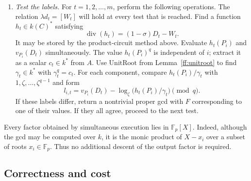 \begin{enumerate}
\item \textit{Test the labels.}
For $t=1,2,\ldots,m$, perform the following operations.
The relation $\lambda d_t=[W_t]$ will hold at every test that is reached.
Find a function $h_t\in k(C)^*$ satisfying
\begin{equation}
                      \operatorname{div}(h_t)
                                   =(1-\sigma)D_t-W_t.
\label{odd:h}
\end{equation}
It may be stored by the product-circuit method above.
Evaluate $h_t(P_i)$ and $v_{P_i}(D_t)$ simultaneously.
The value $h_t(P_i)^q$ is independent of $i$; extract it as a scalar
$c_t\in k^*$ from $A$.
Use $\mathrm{UnitRoot}$ from Lemma~\ref{ff:unitroot} to find
$\gamma_t\in k^*$ with $\gamma_t^q=c_t$.
For each component, compare $h_t(P_i)/\gamma_t$ with
$1,\zeta,\ldots,\zeta^{q-1}$ and form
\begin{equation}
                 l_{i,t}=v_{P_i}(D_t)
                        -\log_\zeta\bigl(h_t(P_i)/\gamma_t\bigr)
                            \pmod q.
\label{odd:labels}
\end{equation}
If these labels differ, return a nontrivial proper gcd with $F$
corresponding to one of their values.  If they all agree, proceed to the
next test.
\end{enumerate}

Every factor obtained by simultaneous execution lies in $\mathbb F_p[X]$.
Indeed, although the gcd may be computed over $k$, it is the monic product
of $X-x_i$ over a subset of roots $x_i\in\mathbb F_p$.
Thus no additional descent of the output factor is required.

\subsection{Correctness and cost}

